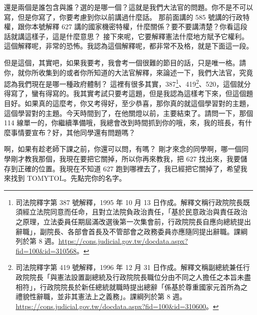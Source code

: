 \hypertarget{c11:cue:294}{}還是兩個是誰包含與誰？選的是哪一個？這就是我們大法官的問題。你不是不可以寫，但是你寫了，你要考慮到你以前講過什麼話。
\hypertarget{c11:cue:295}{}那前面講的 585 號講的行政特權，跟你本號解釋 627 講的國家機密特權，什麼關係？要不要講清楚？你看這段話就講這樣子，這是什麼意思？
\hypertarget{c11:cue:296}{}接下來呢，它要解釋憲法什麼地方賦予它權利。這個解釋呢，非常的恐怖。我認為這個解釋呢，都非常不及格，就是下面這一段。

\hypertarget{c11:cue:297}{}但是這個，其實吧，如果我要考，我會考一個很難的節目的話，只是唯一格。請你，就你所收集到的或者你所知道的大法官解釋，來論述一下，我們大法官，究竟認為我們現在是哪一種政府體制？
\hypertarget{c11:cue:298}{}這裡有很多其實，387\footnote{司法院釋字第 387 號解釋，1995 年 10 月 13 日作成。解釋文稱行政院院長既須經立法院同意而任命，且對立法院負政治責任，「基於民意政治與責任政治之原理，立法委員任期屆滿改選後第一次集會前，行政院院長自應向總統提出辭職」，副院長、各部會首長及不管部會之政務委員亦應隨同提出辭職。課綱列於第 8 週。\url{https://cons.judicial.gov.tw/docdata.aspx?fid=100&id=310568}。}、419\footnote{司法院釋字第 419 號解釋，1996 年 12 月 31 日作成。解釋文稱副總統兼任行政院院長「與憲法設置副總統及行政院院長職位分由不同之人擔任之本旨未盡相符」，行政院院長於新任總統就職時提出總辭「係基於尊重國家元首所為之禮貌性辭職，並非其憲法上之義務」。課綱列於第 8 週。\url{https://cons.judicial.gov.tw/docdata.aspx?fid=100&id=310600}。}、520，這個就分得寫了，蠻有得寫的。我其實考試只要考這題，但是我認為這樣考下來，但這個題目好。如果真的這麼考，你又考得好，至少恭喜，那你真的就這個學習對的主題，這個學習對的主題。今天時間到了，在他關燈以前，主要結束了。請問一下，那個 114 線單一的，你繼續準備哦，我總會改到時間抓到你的哦，來，我的班長，有什麼事情要宣布？好，其他同學還有問題嗎？

\hypertarget{c11:cue:299}{}啊，如果有趁老師下課之前，你還可以問，有嗎？
\hypertarget{c11:cue:300}{}剛才來念的同學啊，哪一個同學剛才教我那個，我現在要把它關掉，所以你再來教我，把 627 找出來，我要儲存到正確的位置。我現在不知道 627 跑到哪裡去了，我已經把它關掉了，希望我來找到 TOMYTOL。先點完你的名字。
